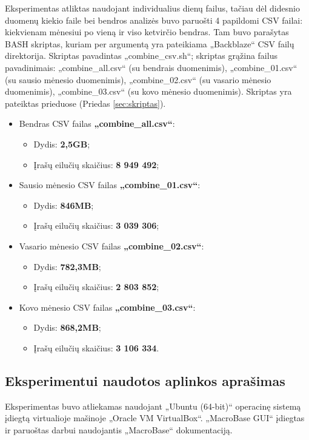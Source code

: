 \documentclass{VUMIFPSkursinis}
\begin{document}
 \label{subsubsubsec:duomenų_paruošimas}
Eksperimentas atliktas naudojant individualius dienų failus, tačiau dėl didesnio duomenų kiekio faile bei bendros analizės buvo paruošti 4 papildomi CSV failai: kiekvienam mėnesiui po vieną ir viso ketvirčio bendras. Tam buvo parašytas BASH skriptas, kuriam per argumentą yra pateikiama „Backblaze“ CSV failų direktorija. Skriptas pavadintas „combine\_csv.sh“; skriptas grąžina failus pavadinimais: „combine\_all.csv“ (su bendrais duomenimis), „combine\_01.csv“ (su sausio mėnesio duomenimis), „combine\_02.csv“ (su vasario mėnesio duomenimis), „combine\_03.csv“ (su kovo mėnesio duomenimis). Skriptas yra pateiktas prieduose (Priedas \ref{sec:skriptas}).
\begin{itemize}
\item Bendras CSV failas \textbf{„combine\_all.csv“}:
\begin{itemize}
\item Dydis: \textbf{2,5GB};
\item Įrašų eilučių skaičius: \textbf{8 949 492};
\end{itemize}

\item Sausio mėnesio CSV failas \textbf{„combine\_01.csv“}:
\begin{itemize}
\item Dydis: \textbf{846MB};
\item Įrašų eilučių skaičius: \textbf{3 039 306};
\end{itemize}

\item Vasario mėnesio CSV failas \textbf{„combine\_02.csv“}:
\begin{itemize}
\item Dydis: \textbf{782,3MB};
\item Įrašų eilučių skaičius: \textbf{2 803 852};
\end{itemize}

\item Kovo mėnesio CSV failas \textbf{„combine\_03.csv“}:
\begin{itemize}
\item Dydis: \textbf{868,2MB};
\item Įrašų eilučių skaičius: \textbf{3 106 334}.
\end{itemize}
\end{itemize}

\subsection{Eksperimentui naudotos aplinkos aprašimas}
Eksperimentas buvo atliekamas naudojant „Ubuntu (64-bit)“ operacinę sistemą įdiegtą virtualioje mašinoje „Oracle VM VirtualBox“. „MacroBase GUI“ įdiegtas ir paruoštas darbui naudojantis „MacroBase“ dokumentaciją.
\end{document}
